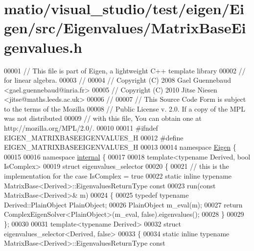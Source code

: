 \hypertarget{matio_2visual__studio_2test_2eigen_2_eigen_2src_2_eigenvalues_2_matrix_base_eigenvalues_8h_source}{}\section{matio/visual\+\_\+studio/test/eigen/\+Eigen/src/\+Eigenvalues/\+Matrix\+Base\+Eigenvalues.h}
\label{matio_2visual__studio_2test_2eigen_2_eigen_2src_2_eigenvalues_2_matrix_base_eigenvalues_8h_source}

\begin{DoxyCode}
00001 \textcolor{comment}{// This file is part of Eigen, a lightweight C++ template library}
00002 \textcolor{comment}{// for linear algebra.}
00003 \textcolor{comment}{//}
00004 \textcolor{comment}{// Copyright (C) 2008 Gael Guennebaud <gael.guennebaud@inria.fr>}
00005 \textcolor{comment}{// Copyright (C) 2010 Jitse Niesen <jitse@maths.leeds.ac.uk>}
00006 \textcolor{comment}{//}
00007 \textcolor{comment}{// This Source Code Form is subject to the terms of the Mozilla}
00008 \textcolor{comment}{// Public License v. 2.0. If a copy of the MPL was not distributed}
00009 \textcolor{comment}{// with this file, You can obtain one at http://mozilla.org/MPL/2.0/.}
00010 
00011 \textcolor{preprocessor}{#ifndef EIGEN\_MATRIXBASEEIGENVALUES\_H}
00012 \textcolor{preprocessor}{#define EIGEN\_MATRIXBASEEIGENVALUES\_H}
00013 
00014 \textcolor{keyword}{namespace }\hyperlink{namespace_eigen}{Eigen} \{ 
00015 
00016 \textcolor{keyword}{namespace }\hyperlink{namespaceinternal}{internal} \{
00017 
00018 \textcolor{keyword}{template}<\textcolor{keyword}{typename} Derived, \textcolor{keywordtype}{bool} IsComplex>
00019 \textcolor{keyword}{struct }eigenvalues\_selector
00020 \{
00021   \textcolor{comment}{// this is the implementation for the case IsComplex = true}
00022   \textcolor{keyword}{static} \textcolor{keyword}{inline} \textcolor{keyword}{typename} MatrixBase<Derived>::EigenvaluesReturnType \textcolor{keyword}{const}
00023   run(\textcolor{keyword}{const} MatrixBase<Derived>& m)
00024   \{
00025     \textcolor{keyword}{typedef} \textcolor{keyword}{typename} Derived::PlainObject PlainObject;
00026     PlainObject m\_eval(m);
00027     \textcolor{keywordflow}{return} ComplexEigenSolver<PlainObject>(m\_eval, \textcolor{keyword}{false}).eigenvalues();
00028   \}
00029 \};
00030 
00031 \textcolor{keyword}{template}<\textcolor{keyword}{typename} Derived>
00032 \textcolor{keyword}{struct }eigenvalues\_selector<Derived, false>
00033 \{
00034   \textcolor{keyword}{static} \textcolor{keyword}{inline} \textcolor{keyword}{typename} MatrixBase<Derived>::EigenvaluesReturnType \textcolor{keyword}{const}

\end{DoxyCode}
